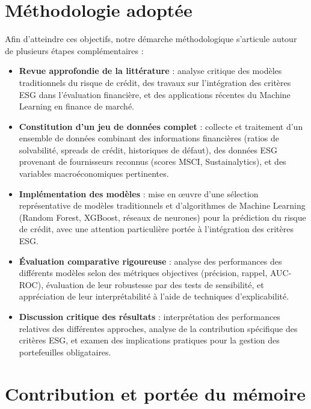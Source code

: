 \section{Méthodologie adoptée}

Afin d'atteindre ces objectifs, notre démarche méthodologique s'articule autour de plusieurs étapes complémentaires :

\begin{itemize}
    \item \textbf{Revue approfondie de la littérature} : analyse critique des modèles traditionnels du risque de crédit, des travaux sur l'intégration des critères ESG dans l'évaluation financière, et des applications récentes du Machine Learning en finance de marché.

    \item \textbf{Constitution d'un jeu de données complet} : collecte et traitement d'un ensemble de données combinant des informations financières (ratios de solvabilité, spreads de crédit, historiques de défaut), des données ESG provenant de fournisseurs reconnus (scores MSCI, Sustainalytics), et des variables macroéconomiques pertinentes.

    \item \textbf{Implémentation des modèles} : mise en œuvre d'une sélection représentative de modèles traditionnels et d'algorithmes de Machine Learning (Random Forest, XGBoost, réseaux de neurones) pour la prédiction du risque de crédit, avec une attention particulière portée à l'intégration des critères ESG.

    \item \textbf{Évaluation comparative rigoureuse} : analyse des performances des différents modèles selon des métriques objectives (précision, rappel, AUC-ROC), évaluation de leur robustesse par des tests de sensibilité, et appréciation de leur interprétabilité à l'aide de techniques d'explicabilité.

    \item \textbf{Discussion critique des résultats} : interprétation des performances relatives des différentes approches, analyse de la contribution spécifique des critères ESG, et examen des implications pratiques pour la gestion des portefeuilles obligataires.
\end{itemize}

\section{Contribution et portée du mémoire}

